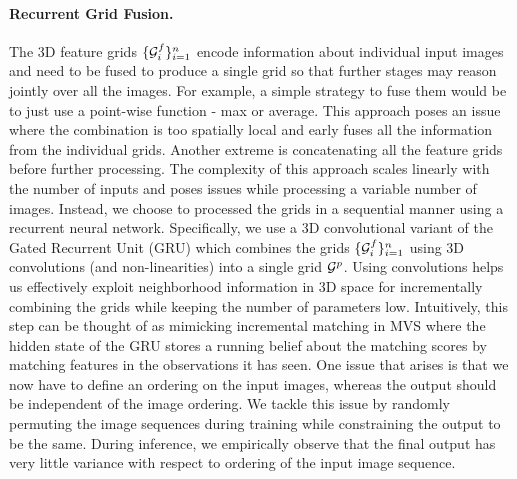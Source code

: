 \documentclass[../thesis.tex]{subfiles}
\begin{document}
\paragraph{Recurrent Grid Fusion.}
The 3D feature grids $\{\mathcal{G}^f_i\}_{i=1}^n$ encode information about individual input images and need to be fused to produce a single grid so that further stages may reason jointly over all the images. For example, a simple strategy to fuse them would be to just use a point-wise function - \eg max or average. This approach poses an issue where the combination is too spatially local and early fuses all the information from the individual grids. Another extreme is concatenating all the feature grids before further processing. The complexity of this approach scales linearly with the number of inputs and poses issues while processing a variable number of images. 
Instead, we choose to processed the grids in a sequential manner using a recurrent neural network. Specifically, we use a 3D convolutional variant of the Gated Recurrent Unit (GRU) \cite{hochreiter1997long,chogru_2014,choy20163d} which combines the grids $\{\mathcal{G}^f_i\}_{i=1}^n$ using 3D convolutions (and non-linearities) into a single grid $\mathcal{G}^p$. Using convolutions helps us effectively exploit neighborhood information in 3D space for incrementally combining the grids while keeping the number of parameters low. Intuitively, this step can be thought of as mimicking incremental matching in MVS where the hidden state of the GRU stores a running belief about the matching scores by matching features in the observations it has seen. One issue that arises is that we now have to define an ordering on the input images, whereas the output should be independent of the image ordering. We tackle this issue by randomly permuting the image sequences during training while constraining the output to be the same. During inference, we empirically observe that the final output has very little variance with respect to ordering of the input image sequence.
\end{document}
